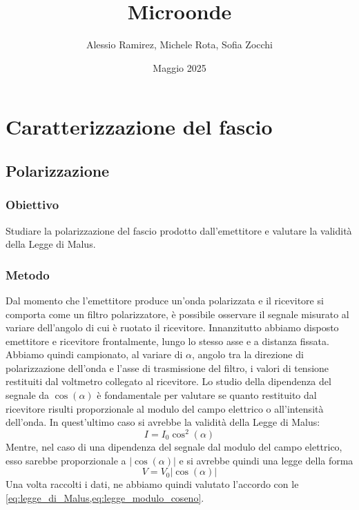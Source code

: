 \documentclass[a4paper]{article}
\title{Microonde}
\author{Alessio Ramirez, Michele Rota, Sofia Zocchi}
\date{Maggio 2025} %
\begin{document}
\maketitle
\tableofcontents
\newpage
\section{Caratterizzazione del fascio}
\subsection{Polarizzazione}
\subsubsection{Obiettivo}
Studiare la polarizzazione del fascio prodotto dall'emettitore e valutare la validità della Legge di Malus.

\subsubsection{Metodo}
Dal momento che l'emettitore produce un'onda polarizzata e il ricevitore si comporta come un filtro polarizzatore, 
è possibile osservare il segnale misurato al variare dell'angolo di cui è ruotato il ricevitore.
Innanzitutto abbiamo disposto emettitore e ricevitore frontalmente, lungo lo stesso asse e a distanza fissata. 
Abbiamo quindi campionato, al variare di $\alpha$, angolo tra la direzione di polarizzazione dell'onda e l'asse di trasmissione del filtro, 
i valori di tensione restituiti dal voltmetro collegato al ricevitore. 
Lo studio della dipendenza del segnale da $\cos(\alpha)$ è fondamentale per valutare se quanto restituito dal ricevitore risulti proporzionale al modulo del campo elettrico o all'intensità dell'onda. 
In quest'ultimo caso si avrebbe la validità della Legge di Malus:
\begin{equation}
I = I_0 \cos^2(\alpha)
\label{eq:legge_di_Malus}
\end{equation}
Mentre, nel caso di una dipendenza del segnale dal modulo del campo elettrico, esso sarebbe proporzionale a $|\cos(\alpha)|$  
e si avrebbe quindi una legge della forma
\begin{equation}
V = V_0|\cos(\alpha)|
\label{eq:legge_modulo_coseno}
\end{equation}
Una volta raccolti i dati, ne abbiamo quindi valutato l'accordo con le \cref{eq:legge_di_Malus,eq:legge_modulo_coseno}.
\end{document}
